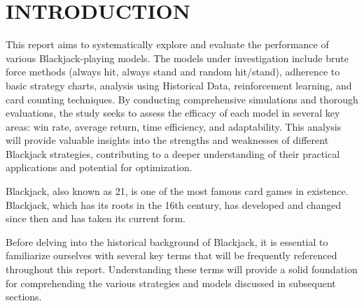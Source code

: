 \documentclass[a4paper,12pt]{report}
\begin{document}
\tableofcontents

\listoffigures

\listoftables

\chapter{INTRODUCTION}
\label{chapter:introduction}

This report aims to systematically explore and evaluate the performance of various Blackjack-playing models. The models under investigation include brute force methods (always hit, always stand and random hit/stand), adherence to basic strategy charts, analysis using Historical Data, reinforcement learning, and card counting techniques. By conducting comprehensive simulations and thorough evaluations, the study seeks to assess the efficacy of each model in several key areas: win rate, average return, time efficiency, and adaptability. This analysis will provide valuable insights into the strengths and weaknesses of different Blackjack strategies, contributing to a deeper understanding of their practical applications and potential for optimization.

Blackjack, also known as 21, is one of the most famous card games in existence. Blackjack, which has its roots in the 16th century, has developed and changed since then and has taken its current form.

Before delving into the historical background of Blackjack, it is essential to familiarize ourselves with several key terms that will be frequently referenced throughout this report. Understanding these terms will provide a solid foundation for comprehending the various strategies and models discussed in subsequent sections.
\end{document}
